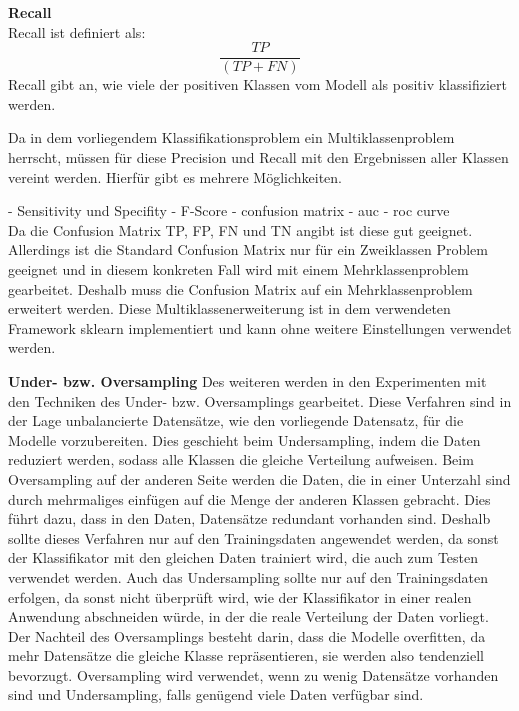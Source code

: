 \textbf{Recall} \\
Recall ist definiert als: \\
\begin{equation}
 \frac{TP}{(TP+FN)}
\end{equation}
Recall gibt an, wie viele der positiven Klassen vom Modell als positiv klassifiziert werden. 


Da in dem vorliegendem Klassifikationsproblem ein Multiklassenproblem herrscht, müssen für diese Precision und Recall mit den Ergebnissen aller Klassen vereint werden. 
Hierfür gibt es mehrere Möglichkeiten. 



- Sensitivity und Specifity
- F-Score
- confusion matrix
- auc - roc curve \\
Da die Confusion Matrix TP, FP, FN und TN angibt ist diese gut geeignet. 
Allerdings ist die Standard Confusion Matrix nur für ein Zweiklassen Problem geeignet und in diesem konkreten Fall wird mit einem Mehrklassenproblem gearbeitet.
Deshalb muss die Confusion Matrix auf ein Mehrklassenproblem erweitert werden.
Diese Multiklassenerweiterung ist in dem verwendeten Framework sklearn implementiert und kann ohne weitere Einstellungen verwendet werden.

\textbf{Under- bzw. Oversampling}
Des weiteren werden in den Experimenten mit den Techniken des Under- bzw. Oversamplings gearbeitet. 
Diese Verfahren sind in der Lage unbalancierte Datensätze, wie den vorliegende Datensatz, für die Modelle vorzubereiten. 
Dies geschieht beim Undersampling, indem die Daten reduziert werden, sodass alle Klassen die gleiche Verteilung aufweisen. 
Beim Oversampling auf der anderen Seite werden die Daten, die in einer Unterzahl sind durch mehrmaliges einfügen auf die Menge der anderen Klassen gebracht. 
Dies führt dazu, dass in den Daten, Datensätze redundant vorhanden sind. 
Deshalb sollte dieses Verfahren nur auf den Trainingsdaten angewendet werden, da sonst der Klassifikator mit den gleichen Daten trainiert wird, die auch zum Testen verwendet werden. 
Auch das Undersampling sollte nur auf den Trainingsdaten erfolgen, da sonst nicht überprüft wird, wie der Klassifikator in einer realen Anwendung abschneiden würde, in der die reale Verteilung der Daten vorliegt. \cite{ZITAT}
\cite{ML 3.6.3 Sampling}
Der Nachteil des Oversamplings besteht darin, dass die Modelle overfitten, da mehr Datensätze die gleiche Klasse repräsentieren, sie werden also tendenziell bevorzugt. 
\cite{ML 4.4.4 Tree Pruning}
Oversampling wird verwendet, wenn zu wenig Datensätze vorhanden sind und Undersampling, falls genügend viele Daten verfügbar sind. 

